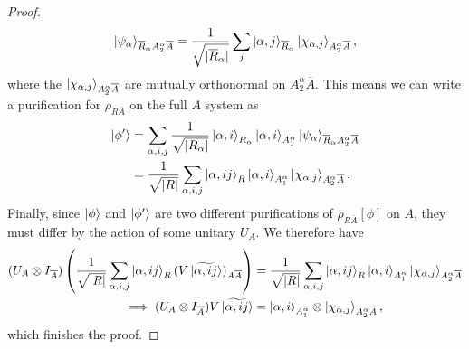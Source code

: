 \documentclass[12pt,a4paper]{report}
\numberwithin{equation}{section}
\newcommand{\ol}[1]{\overline{#1}}
\theoremstyle{definition}
\theoremstyle{theorem}
\theoremstyle{theorem}
\theoremstyle{example}
\theoremstyle{definition}
\begin{document}
\begin{proof}
	\begin{equation}
		\ket{\psi_{\alpha}}_{\ol{R}_{\alpha}A_{2}^{\alpha}\ol{A}}=\frac{1}{\sqrt{|\ol{R}_{\alpha}|}}\sum_{j}\ket{\alpha,j}_{\ol{R}_{\alpha}}\ket{\chi_{\alpha,j}}_{A_{2}^{\alpha}\ol{A}},
	\end{equation}
	where the $\ket{\chi_{\alpha,j}}_{A_{2}^{\alpha}\ol{A}}$ are mutually orthonormal on $A_{2}^{\alpha}\ol{A}$. This means we can write a purification for $\rho_{R\ol{A}}$ on the full $A$ system as
	\begin{equation}
		\begin{aligned}
			\ket{\phi'}&=\sum_{\alpha,i,j}\frac{1}{\sqrt{|R_{\alpha}|}}\ket{\alpha,i}_{R_{\alpha}}\ket{\alpha,i}_{A_{1}^{\alpha}}\ket{\psi_{\alpha}}_{\ol{R}_{\alpha}A_{2}^{\alpha}\ol{A}}\\&=\frac{1}{\sqrt{|R|}}\sum_{\alpha,i,j}\ket{\alpha,ij}_{R}\ket{\alpha,i}_{A_{1}^{\alpha}}\ket{\chi_{\alpha,j}}_{A_{2}^{\alpha}\ol{A}}.
		\end{aligned}
	\end{equation}
	Finally, since $\ket{\phi}$ and $\ket{\phi'}$ are two different purifications of $\rho_{R\ol{A}}[\phi]$ on $A$, they must differ by the action of some unitary $U_{A}$. We therefore have
	\begin{equation}
		\begin{aligned}
			(U_{A}\otimes I_{\ol{A}})\left(\frac{1}{\sqrt{|R|}}\sum_{\alpha,i,j}\ket{\alpha,ij}_{R}(V\ket{\widetilde{\alpha, ij}})_{A\ol{A}}\right)&=\frac{1}{\sqrt{|R|}}\sum_{\alpha,i,j}\ket{\alpha,ij}_{R}\ket{\alpha,i}_{A_{1}^{\alpha}}\ket{\chi_{\alpha,j}}_{A_{2}^{\alpha}\ol{A}}\\
			\implies (U_{A}\otimes I_{\ol{A}})V\ket{\widetilde{\alpha,ij}}&=\ket{\alpha,i}_{A_{1}^{\alpha}}\otimes\ket{\chi_{\alpha,j}}_{A_{2}^{\alpha}\ol{A}},
		\end{aligned}
	\end{equation}
	which finishes the proof.
\end{proof}
\end{document}
